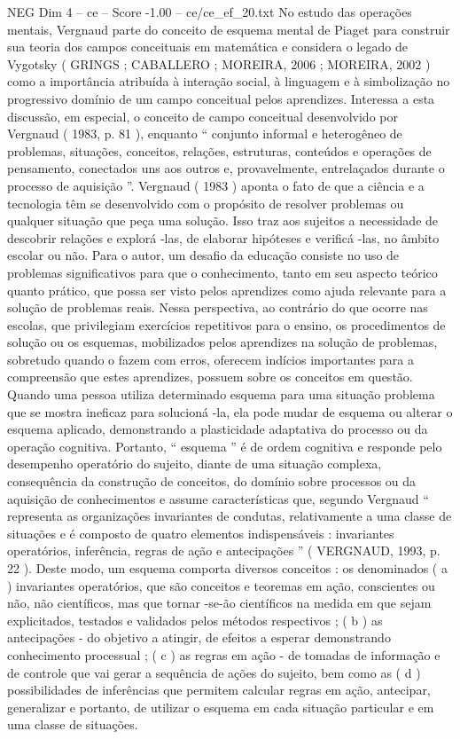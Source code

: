 \begin{textsample}{NEG Dim 4 – ce – Score -1.00 – ce/ce\_ef\_20.txt}
No estudo das operações mentais, Vergnaud parte do conceito de esquema mental de Piaget para construir sua teoria dos campos conceituais em matemática e considera o legado de Vygotsky ( GRINGS ; CABALLERO ; MOREIRA, 2006 ; MOREIRA, 2002 ) como a importância atribuída à interação social, à linguagem e à simbolização no progressivo domínio de um campo conceitual pelos aprendizes.
Interessa a esta discussão, em especial, o conceito de campo conceitual desenvolvido por Vergnaud ( 1983, p. 81 ), enquanto “ conjunto informal e heterogêneo de problemas, situações, conceitos, relações, estruturas, conteúdos e operações de pensamento, conectados uns aos outros e, provavelmente, entrelaçados durante o processo de aquisição ”.
Vergnaud ( 1983 ) aponta o fato de que a ciência e a tecnologia têm se desenvolvido com o propósito de resolver problemas ou qualquer situação que peça uma solução.
Isso traz aos sujeitos a necessidade de descobrir relações e explorá -las, de elaborar hipóteses e verificá -las, no âmbito escolar ou não.
Para o autor, um desafio da educação consiste no uso de problemas significativos para que o conhecimento, tanto em seu aspecto teórico quanto prático, que possa ser visto pelos aprendizes como ajuda relevante para a solução de problemas reais.
Nessa perspectiva, ao contrário do que ocorre nas escolas, que privilegiam exercícios repetitivos para o ensino, os procedimentos de solução ou os esquemas, mobilizados pelos aprendizes na solução de problemas, sobretudo quando o fazem com erros, oferecem indícios importantes para a compreensão que estes aprendizes, possuem sobre os conceitos em questão.
Quando uma pessoa utiliza determinado esquema para uma situação problema que se mostra ineficaz para solucioná -la, ela pode mudar de esquema ou alterar o esquema aplicado, demonstrando a plasticidade adaptativa do processo ou da operação cognitiva.
Portanto, “ esquema ” é de ordem cognitiva e responde pelo desempenho operatório do sujeito, diante de uma situação complexa, consequência da construção de conceitos, do domínio sobre processos ou da aquisição de conhecimentos e assume características que, segundo Vergnaud “ representa as organizações invariantes de condutas, relativamente a uma classe de situações e é composto de quatro elementos indispensáveis : invariantes operatórios, inferência, regras de ação e antecipações ” ( VERGNAUD, 1993, p. 22 ).
Deste modo, um esquema comporta diversos conceitos : os denominados ( a ) invariantes operatórios, que são conceitos e teoremas em ação, conscientes ou não, não científicos, mas que tornar -se-ão científicos na medida em que sejam explicitados, testados e validados pelos métodos respectivos ; ( b ) as antecipações - do objetivo a atingir, de efeitos a esperar demonstrando conhecimento processual ; ( c ) as regras em ação - de tomadas de informação e de controle que vai gerar a sequência de ações do sujeito, bem como as ( d ) possibilidades de inferências que permitem calcular regras em ação, antecipar, generalizar e portanto, de utilizar o esquema em cada situação particular e em uma classe de situações.

\end{textsample}

